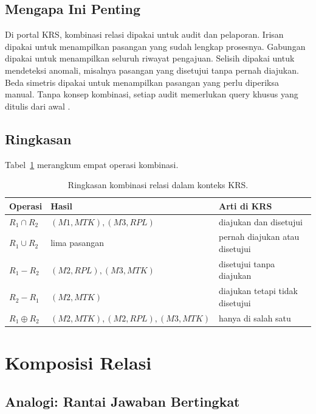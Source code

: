 \documentclass[11pt,a4paper]{article}
\begin{document}
\subsection{Mengapa Ini Penting}

Di portal KRS, kombinasi relasi dipakai untuk audit dan pelaporan. Irisan dipakai untuk menampilkan pasangan yang sudah lengkap prosesnya. Gabungan dipakai untuk menampilkan seluruh riwayat pengajuan. Selisih dipakai untuk mendeteksi anomali, misalnya pasangan yang disetujui tanpa pernah diajukan. Beda simetris dipakai untuk menampilkan pasangan yang perlu diperiksa manual. Tanpa konsep kombinasi, setiap audit memerlukan query khusus yang ditulis dari awal \cite{date}.

\subsection{Ringkasan}

Tabel~\ref{tab:kombinasi} merangkum empat operasi kombinasi.

\begin{table}[H]
	\centering
	\caption{Ringkasan kombinasi relasi dalam konteks KRS.}
	\label{tab:kombinasi}
	\small
	\begin{tabularx}{\textwidth}{l X X}
		\toprule
		Operasi          & Hasil                        & Arti di KRS                     \\
		\midrule
		$R_1 \cap R_2$   & $(M1,MTK),(M3,RPL)$          & diajukan dan disetujui          \\
		$R_1 \cup R_2$   & lima pasangan                & pernah diajukan atau disetujui  \\
		$R_1-R_2$        & $(M2,RPL),(M3,MTK)$          & disetujui tanpa diajukan        \\
		$R_2-R_1$        & $(M2,MTK)$                   & diajukan tetapi tidak disetujui \\
		$R_1 \oplus R_2$ & $(M2,MTK),(M2,RPL),(M3,MTK)$ & hanya di salah satu             \\
		\bottomrule
	\end{tabularx}
\end{table}

\section{Komposisi Relasi}

\subsection{Analogi: Rantai Jawaban Bertingkat}
\end{document}
